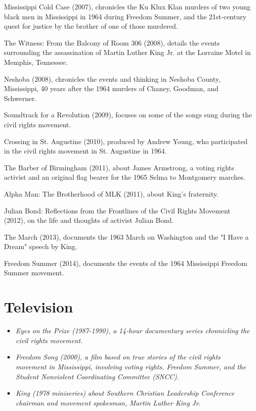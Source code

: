 Mississippi Cold Case (2007), chronicles the Ku Klux Klan murders of two
young black men in Mississippi in 1964 during Freedom Summer, and the
21st-century quest for justice by the brother of one of those murdered.

The Witness: From the Balcony of Room 306 (2008), details the events
surrounding the assassination of Martin Luther King Jr. at the Lorraine
Motel in Memphis, Tennessee.

Neshoba (2008), chronicles the events and thinking in Neshoba County,
Mississippi, 40 years after the 1964 murders of Chaney, Goodman, and
Schwerner.

Soundtrack for a Revolution (2009), focuses on some of the songs sung
during the civil rights movement.

Crossing in St. Augustine (2010), produced by Andrew Young, who
participated in the civil rights movement in St. Augustine in 1964.

The Barber of Birmingham (2011), about James Armstrong, a voting rights
activist and an original flag bearer for the 1965 Selma to Montgomery
marches.

Alpha Man: The Brotherhood of MLK (2011), about King's fraternity.

Julian Bond: Reflections from the Frontlines of the Civil Rights
Movement (2012), on the life and thoughts of activist Julian Bond.

The March (2013), documents the 1963 March on Washington and the "I Have
a Dream" speech by King.

Freedom Summer (2014), documents the events of the 1964 Mississippi
Freedom Summer movement.

\section{Television}\label{television}

\begin{itemize}
\item
  \emph{Eyes on the Prize (1987-1990), a 14-hour documentary series
  chronicling the civil rights movement.}
\item
  \emph{Freedom Song (2000), a film based on true stories of the civil
  rights movement in Mississippi, involving voting rights, Freedom
  Summer, and the Student Nonviolent Coordinating Committee (SNCC).}
\item
  \emph{King (1978 miniseries) about Southern Christian Leadership
  Conference chairman and movement spokesman, Martin Luther King Jr.}
\end{itemize}

